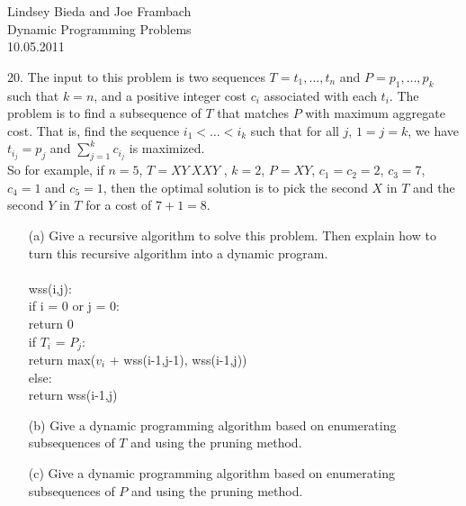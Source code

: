 \documentclass[10pt]{article}
\newcommand{\tab}{\hspace*{2em}}
\newcommand{\tabb}{\hspace*{4em}}
\begin{document}
	\begin{flushright}
	Lindsey Bieda and Joe Frambach\\
	Dynamic Programming Problems\\
	10.05.2011
	\end{flushright}
	20. The input to this problem is two sequences $T = t_1, \ldots, t_n$ and $P = p_1, \ldots, p_k$ such that $k = n$, and
	a positive integer cost $c_i$ associated with each $t_i$.  The problem is to find a subsequence of $T$ that
	matches $P$ with maximum aggregate cost. That is, find the sequence $i_1 < \ldots < i_k$ such that for all $j$,
	$1 = j = k$, we have $t_{i_j} = p_j$ and $\sum_{j=1}^k c_{i_j}$ is maximized.\\
	So for example, if $n = 5$, $T = XY~XXY$ , $k = 2$, $P = XY$, $c_1 = c_2 = 2$, $c_3 = 7$, $c_4 = 1$ and $c_5 = 1$, then
	the optimal solution is to pick the second $X$ in $T$ and the second $Y$ in $T$ for a cost of $7 + 1 = 8$.
	\begin{enumerate}
		\item[(a)]	Give a recursive algorithm to solve this problem. Then explain how to turn this recursive algorithm
					into a dynamic program.\\
					\\
					wss(i,j):\\
					\tab if i = 0 or j = 0:\\
					\tabb return 0\\
					\tab if $T_i$ = $P_j$:\\	
					\tabb return max($v_i$ + wss(i-1,j-1), wss(i-1,j))\\
					\tab else:\\
					\tabb return wss(i-1,j)\\
					
		\item[(b)]	Give a dynamic programming algorithm based on enumerating subsequences of $T$ and using the
					pruning method. 
		\item[(c)]	Give a dynamic programming algorithm based on enumerating subsequences of $P$ and using the
					pruning method.
	\end{enumerate}
\end{document}
